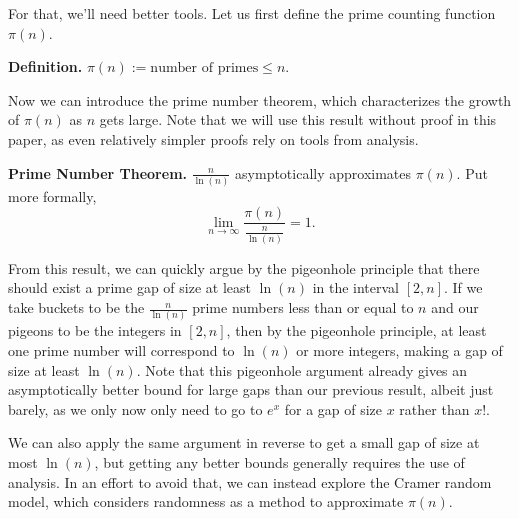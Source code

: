 \documentclass[conference]{IEEEtran}
\begin{document}
For that, we'll need better tools. Let us first define
the prime counting function $\pi(n)$.

\smallskip\noindent
\textbf{Definition.} $\pi(n) := \text{number of primes} \le n.$
\smallskip

Now we can introduce the prime number theorem,
which characterizes the growth of $\pi(n)$ as $n$ gets large.
Note that we will use this result without proof in this paper,
as even relatively simpler proofs rely on tools from
analysis.

\smallskip\noindent
\textbf{Prime Number Theorem.}
$\frac{n}{\ln(n)}$ asymptotically approximates $\pi(n)$.
Put more formally,
\[\displaystyle \lim_{n \to \infty} \frac{\pi(n)}{\frac{n}{\ln(n)}} = 1.\]
\smallskip

From this result, we can quickly argue by the pigeonhole principle
that there should exist a prime gap of size at least $\ln(n)$ in the
interval $[2, n]$. If we take buckets to be the $\frac{n}{\ln(n)}$
prime numbers less than or equal to $n$ and our pigeons to be
the integers in $[2, n]$, then by the pigeonhole principle, at least one
prime number will correspond to $\ln(n)$ or more integers, making
a gap of size at least $\ln(n)$. Note that this pigeonhole argument already gives
an asymptotically better bound for large gaps than our previous result,
albeit just barely, as we only now only need to go to $e^x$ for a gap
of size $x$ rather than $x!$.

We can also apply the same argument in reverse to get a small gap of size
at most $\ln(n)$, but getting any better bounds generally requires the
use of analysis. In an effort to avoid that, we can instead explore
the Cramer random model, which considers randomness as a method
to approximate $\pi(n)$.
\end{document}
